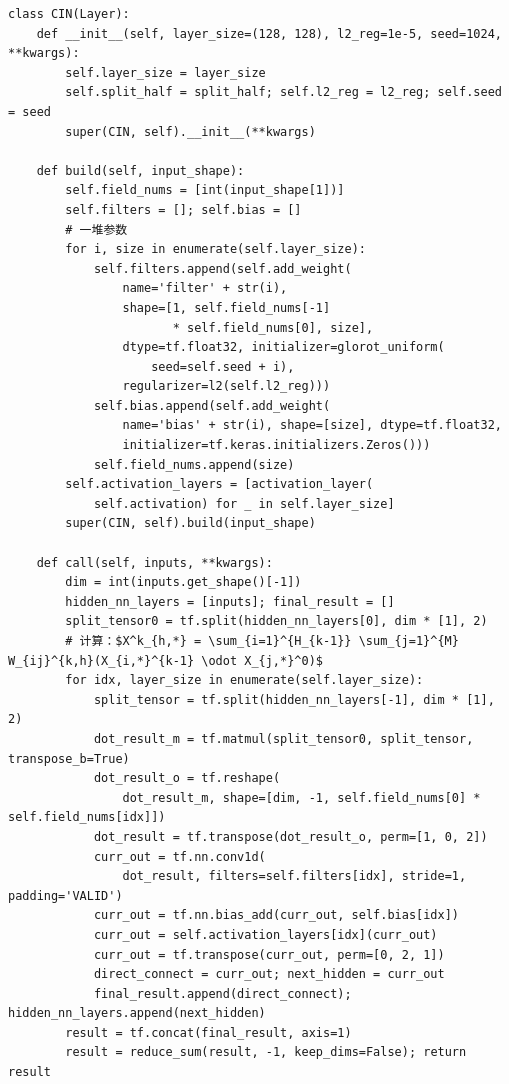 \documentclass[degree=project,degree-type=project,cjk-font=noto]{thuthesis}
\begin{document}
  \begin{verbatim}
class CIN(Layer):
    def __init__(self, layer_size=(128, 128), l2_reg=1e-5, seed=1024, **kwargs):
        self.layer_size = layer_size
        self.split_half = split_half; self.l2_reg = l2_reg; self.seed = seed
        super(CIN, self).__init__(**kwargs)

    def build(self, input_shape):
        self.field_nums = [int(input_shape[1])]
        self.filters = []; self.bias = []
        # 一堆参数
        for i, size in enumerate(self.layer_size):
            self.filters.append(self.add_weight(
                name='filter' + str(i),
                shape=[1, self.field_nums[-1]
                       * self.field_nums[0], size],
                dtype=tf.float32, initializer=glorot_uniform(
                    seed=self.seed + i),
                regularizer=l2(self.l2_reg)))
            self.bias.append(self.add_weight(
                name='bias' + str(i), shape=[size], dtype=tf.float32,
                initializer=tf.keras.initializers.Zeros()))
            self.field_nums.append(size)
        self.activation_layers = [activation_layer(
            self.activation) for _ in self.layer_size]
        super(CIN, self).build(input_shape)

    def call(self, inputs, **kwargs):
        dim = int(inputs.get_shape()[-1])
        hidden_nn_layers = [inputs]; final_result = []
        split_tensor0 = tf.split(hidden_nn_layers[0], dim * [1], 2)
        # 计算：$X^k_{h,*} = \sum_{i=1}^{H_{k-1}} \sum_{j=1}^{M} W_{ij}^{k,h}(X_{i,*}^{k-1} \odot X_{j,*}^0)$
        for idx, layer_size in enumerate(self.layer_size):
            split_tensor = tf.split(hidden_nn_layers[-1], dim * [1], 2)
            dot_result_m = tf.matmul(split_tensor0, split_tensor, transpose_b=True)
            dot_result_o = tf.reshape(
                dot_result_m, shape=[dim, -1, self.field_nums[0] * self.field_nums[idx]])
            dot_result = tf.transpose(dot_result_o, perm=[1, 0, 2])
            curr_out = tf.nn.conv1d(
                dot_result, filters=self.filters[idx], stride=1, padding='VALID')
            curr_out = tf.nn.bias_add(curr_out, self.bias[idx])
            curr_out = self.activation_layers[idx](curr_out)
            curr_out = tf.transpose(curr_out, perm=[0, 2, 1])
            direct_connect = curr_out; next_hidden = curr_out
            final_result.append(direct_connect); hidden_nn_layers.append(next_hidden)
        result = tf.concat(final_result, axis=1)
        result = reduce_sum(result, -1, keep_dims=False); return result
  \end{verbatim}
\end{document}
